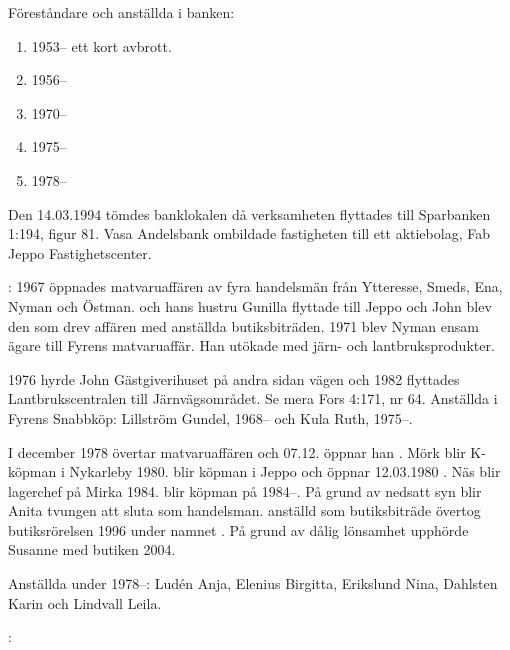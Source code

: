 Föreståndare och anställda i banken:
\begin{enumerate}
  \item {}     1953-- ett kort avbrott.  
  \item {}      1956--		                 
  \item {}   1970--		                 
  \item {}    1975--		                 
  \item {}    1978--		                 
\end{enumerate}
Den 14.03.1994 tömdes banklokalen då verksamheten flyttades till Sparbanken 1:194, figur 81. Vasa Andelsbank ombildade fastigheten till ett aktiebolag, Fab Jeppo	Fastighetscenter.


:
1967 öppnades matvaruaffären  av fyra handelsmän från Ytteresse, Smeds, Ena, Nyman och Östman.  och hans hustru Gunilla flyttade till Jeppo och John blev den som drev affären med anställda butiksbiträden. 1971 blev Nyman ensam ägare till Fyrens matvaruaffär. Han utökade med järn- och lantbruksprodukter.

1976 hyrde John Gästgiverihuset på andra sidan vägen och 1982 flyttades Lantbrukscentralen till Järnvägsområdet. Se mera Fors 4:171, nr 64.	Anställda i Fyrens Snabbköp:	Lillström Gundel,	1968--	och	Kula Ruth, 1975--.

I december 1978 övertar  matvaruaffären och 07.12. öppnar han . Mörk blir K-köpman i Nykarleby 1980.  blir köpman i Jeppo och öppnar 12.03.1980 . Näs blir lagerchef på Mirka 1984.  blir köpman på 	 1984--. På grund av nedsatt syn blir Anita tvungen att sluta	som handelsman.  anställd som butiksbiträde övertog	butiksrörelsen 1996 under namnet . På grund av dålig lönsamhet upphörde Susanne med butiken 2004.

Anställda under 1978--: Ludén Anja, Elenius Birgitta, Erikslund Nina, Dahlsten Karin och Lindvall Leila.


:

